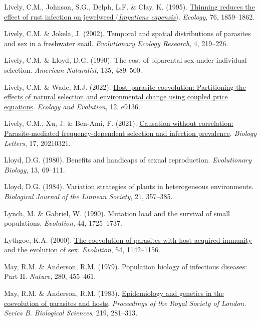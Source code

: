 \documentclass[
  letterpaper,
]{book}
\newlength{\cslhangindent}
\newenvironment{CSLReferences}[2] %
 {\begin{list}{}{%
  \setlength{\itemindent}{0pt}
  \setlength{\leftmargin}{0pt}
  \setlength{\parsep}{0pt}
  \ifodd #1
   \setlength{\leftmargin}{\cslhangindent}
   \setlength{\itemindent}{-1\cslhangindent}
  \fi
  \setlength{\itemsep}{#2\baselineskip}}}
 {\end{list}}
\begin{document}
\begin{CSLReferences}{1}{0}
Lively, C.M., Johnson, S.G., Delph, L.F. \& Clay, K. (1995).
\href{https://doi.org/10.2307/1940718}{Thinning reduces the effect of
rust infection on jewelweed (\emph{{I}mpatiens capensis})}.
\emph{Ecology}, 76, 1859--1862.

Lively, C.M. \& Jokela, J. (2002). Temporal and spatial distributions of
parasites and sex in a freshwater snail. \emph{Evolutionary Ecology
Research}, 4, 219--226.

Lively, C.M. \& Lloyd, D.G. (1990). The cost of biparental sex under
individual selection. \emph{American Naturalist}, 135, 489--500.

Lively, C.M. \& Wade, M.J. (2022).
\href{https://doi.org/10.1002/ece3.9136}{Host--parasite coevolution:
Partitioning the effects of natural selection and environmental change
using coupled price equations}. \emph{Ecology and Evolution}, 12, e9136.

Lively, C.M., Xu, J. \& Ben-Ami, F. (2021).
\href{https://doi.org/10.1098/rsbl.2021.0321}{Causation without
correlation: Parasite-mediated frequency-dependent selection and
infection prevalence}. \emph{Biology Letters}, 17, 20210321.

Lloyd, D.G. (1980). Benefits and handicaps of sexual reproduction.
\emph{Evolutionary Biology}, 13, 69--111.

Lloyd, D.G. (1984). Variation strategies of plants in heterogeneous
environments. \emph{Biological Journal of the Linnean Society}, 21,
357--385.

Lynch, M. \& Gabriel, W. (1990). Mutation load and the survival of small
populations. \emph{Evolution}, 44, 1725--1737.

Lythgoe, K.A. (2000).
\href{https://doi.org/10.1111/j.0014-3820.2000.tb00550.x}{The
coevolution of parasites with host-acquired immunity and the evolution
of sex}. \emph{Evolution}, 54, 1142--1156.

May, R.M. \& Anderson, R.M. (1979). Population biology of infectious
diseases: Part II. \emph{Nature}, 280, 455--461.

May, R.M. \& Anderson, R.M. (1983).
\href{https://doi.org/10.1098/rspb.1983.0075}{Epidemiology and genetics
in the coevolution of parasites and hosts}. \emph{Proceedings of the
Royal Society of London. Series B. Biological Sciences}, 219, 281--313.


\end{CSLReferences}
\end{document}
